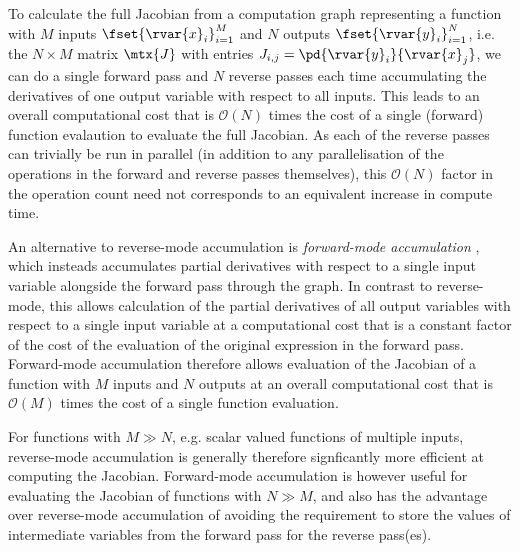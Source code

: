 To calculate the full Jacobian from a computation graph representing a function with $M$ inputs $\fset{\rvar{x}_i}_{i=1}^M$ and $N$ outputs $\fset{\rvar{y}_i}_{i=1}^N$, i.e. the $N \times M$ matrix $\mtx{J}$ with entries $J_{i,j} = \pd{\rvar{y}_i}{\rvar{x}_j}$, we can do a single forward pass and $N$ reverse passes each time accumulating the derivatives of one output variable with respect to all inputs. This leads to an overall computational cost that is $\mathcal{O}(N)$ times the cost of a single (forward) function evalaution to evaluate the full Jacobian. As each of the reverse passes can trivially be run in parallel (in addition to any parallelisation of the operations in the forward and reverse passes themselves), this $\mathcal{O}(N)$ factor in the operation count need not corresponds to an equivalent increase in compute time.

An alternative to reverse-mode accumulation is \emph{forward-mode accumulation} \citep{wengert1964simple}, which insteads accumulates partial derivatives with respect to a single input variable alongside the forward pass through the graph. In contrast to reverse-mode, this allows calculation of the partial derivatives of all output variables with respect to a single input variable at a computational cost that is a constant factor of the cost of the evaluation of the original expression in the forward pass. Forward-mode accumulation therefore allows evaluation of the Jacobian of a function with $M$ inputs and $N$ outputs at an overall computational cost that is $\mathcal{O}(M)$ times the cost of a single function evaluation. 

For functions with $M \gg N$, e.g. scalar valued functions of multiple inputs, reverse-mode accumulation is generally therefore signficantly more efficient at computing the Jacobian. Forward-mode accumulation is however useful for evaluating the Jacobian of functions with $N \gg M$, and also has the advantage over reverse-mode accumulation of avoiding the requirement to store the values of intermediate variables from the forward pass for the reverse pass(es).



